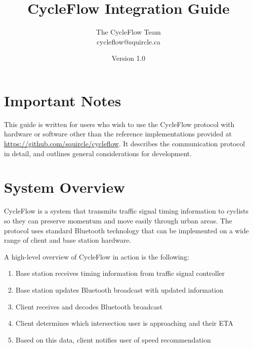 \documentclass[12pt, oneside]{article}
\title{CycleFlow Integration Guide}
\author{The CycleFlow Team\\cycleflow@squircle.ca}
\date{Version 1.0}
\begin{document}
\pagestyle{fancy}

\maketitle
\thispagestyle{empty} %
\pagebreak

\section*{Important Notes}


This guide is written for users who wish to use the CycleFlow protocol with hardware or software other than the reference implementations provided at \url{https://github.com/squircle/cycleflow}. It describes the communication protocol in detail, and outlines general considerations for development. 


\section{System Overview}
CycleFlow is a system that transmits traffic signal timing information to cyclists so they can preserve momentum and move easily through urban areas. The protocol uses standard Bluetooth technology that can be implemented on a wide range of client and base station hardware. 

A high-level overview of CycleFlow in action is the following:
\begin{enumerate}
\item Base station receives timing information from traffic signal controller
\item Base station updates Bluetooth broadcast with updated information
\item Client receives and decodes Bluetooth broadcast
\item Client determines which intersection user is approaching and their ETA
\item Based on this data, client notifies user of speed recommendation
\end{enumerate}
\end{document}
